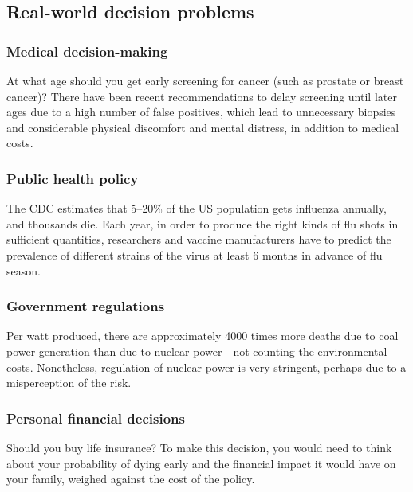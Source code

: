 \documentclass[12pt]{article}
\begin{document}
\subsection{Real-world decision problems}


\subsubsection*{Medical decision-making}

At what age should you get early screening for cancer (such as prostate or breast cancer)?  There have been recent recommendations to delay screening until later ages due to a high number of false positives, which lead to unnecessary biopsies and considerable physical discomfort and mental distress, in addition to medical costs.

\subsubsection*{Public health policy}

The CDC estimates that 5--20\% of the US population gets influenza annually, and thousands die. Each year, in order to produce the right kinds of flu shots in sufficient quantities, researchers and vaccine manufacturers have to predict the prevalence of different strains of the virus at least 6 months in advance of flu season.

\subsubsection*{Government regulations}

Per watt produced, there are approximately 4000 times more deaths due to coal power generation than due to nuclear power---not counting the environmental costs. Nonetheless, regulation of nuclear power is very stringent, perhaps due to a misperception of the risk.

\subsubsection*{Personal financial decisions}

Should you buy life insurance? To make this decision, you would need to think about your probability of dying early and the financial impact it would have on your family, weighed against the cost of the policy.
\end{document}
